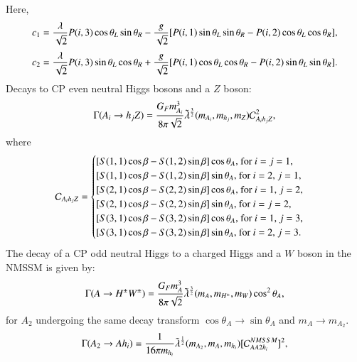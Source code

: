 \documentclass[final,3p,times,pdflatex]{elsarticle}
\begin{document}
Here,
\begin{equation}
c_{1} = {\lambda \over \sqrt{2}}P(i,3)\cos\theta_L \sin\theta_R - {g \over \sqrt{2}}[P(i,1)\sin\theta_L \sin\theta_R - P(i,2)\cos\theta_L \cos\theta_R],
\end{equation}
\begin{equation}
c_{2} = {\lambda \over \sqrt{2}}P(i,3)\sin\theta_L \cos\theta_R + {g \over \sqrt{2}}[P(i,1)\cos\theta_L \cos\theta_R - P(i,2)\sin\theta_L \sin\theta_R].
\end{equation}
Decays to CP even neutral Higgs bosons and a $Z$ boson:
\begin{equation} \label{AhZNMSSM}
\Gamma(A_i \rightarrow h_j Z) = {G_{F} m_{A_i}^3 \over 8 \pi \sqrt{2}} \tilde{\lambda}^{3 \over 2}(m_{A_i},m_{h_j},m_{Z}) \mathcal{C}_{A_i h_j Z}^2,
\end{equation}
where
\begin{equation}
\mathcal{C}_{A_i h_j Z} = \begin{cases}
							[S(1,1)\cos\beta - S(1,2)\sin\beta]\cos\theta_A $, for $i=j=1$,$ \\
							[S(1,1)\cos\beta - S(1,2)\sin\beta]\sin\theta_A $, for $i=2$, $j=1$,$ \\
							[S(2,1)\cos\beta - S(2,2)\sin\beta]\cos\theta_A $, for $i=1$, $j=2$,$ \\
							[S(2,1)\cos\beta - S(2,2)\sin\beta]\sin\theta_A $, for $i=j=2$,$ \\
							[S(3,1)\cos\beta - S(3,2)\sin\beta]\cos\theta_A $, for $i=1$, $j=3$,$ \\
							[S(3,1)\cos\beta - S(3,2)\sin\beta]\sin\theta_A $, for $i=2$, $j=3. \\
							\end{cases}
\end{equation}
The decay of a CP odd neutral Higgs to a charged Higgs and a $W$ boson in the NMSSM is given by:
\begin{equation} \label{AHpmWNMSSM}
\Gamma(A \rightarrow H^{\pm} W^{\pm}) = {G_{F} m_{A}^3 \over 8 \pi \sqrt{2}} \tilde{\lambda}^{3 \over 2}(m_{A},m_{H^{\pm}},m_{W}) \cos^2 \theta_A,
\end{equation}
for $A_2$ undergoing the same decay transform $\cos\theta_A \rightarrow \sin\theta_A$ and $m_{A} \rightarrow m_{A_2}$.
\begin{equation} \label{A2AhiNMSSM}
\Gamma(A_2 \rightarrow A h_i) = {1 \over 16 \pi m_{h_i}} \tilde{\lambda}^{1 \over 2}(m_{A_2},m_{A},m_{h_i})[\mathcal{C}_{AA2h_i}^{NMSSM}]^2,
\end{equation}
\end{document}
